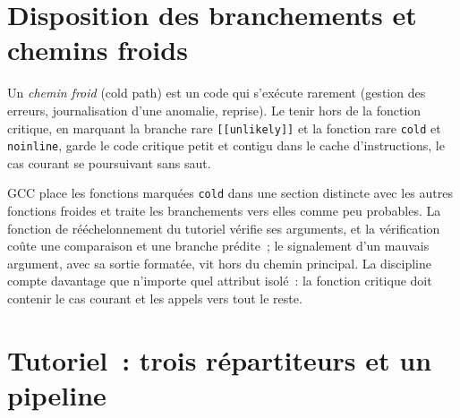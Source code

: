 \section{Disposition des branchements et chemins froids}

\begin{definition}\label{def:ll:cpp-for-latency-ii-compile-time:cold}
Un \emph{chemin froid} (cold path) est un code qui s'exécute rarement (gestion des erreurs, journalisation d'une anomalie, reprise). Le tenir
hors de la fonction critique, en marquant la branche rare \texttt{[[unlikely]]} et la fonction rare \texttt{cold} et
\texttt{noinline}, garde le code critique petit et contigu dans le cache d'instructions, le cas courant se poursuivant sans saut.
\end{definition}

GCC place les fonctions marquées \texttt{cold} dans une section distincte avec les autres fonctions froides et traite les branchements vers elles
comme peu probables. La fonction de rééchelonnement du tutoriel vérifie ses arguments, et la vérification coûte une comparaison et une
branche prédite~; le signalement d'un mauvais argument, avec sa sortie formatée, vit hors du chemin principal. La discipline compte davantage
que n'importe quel attribut isolé~: la fonction critique doit contenir le cas courant et les appels vers tout le reste.

\section{Tutoriel~: trois répartiteurs et un pipeline}\label{tut:ll:cpp-for-latency-ii-compile-time:tut}

